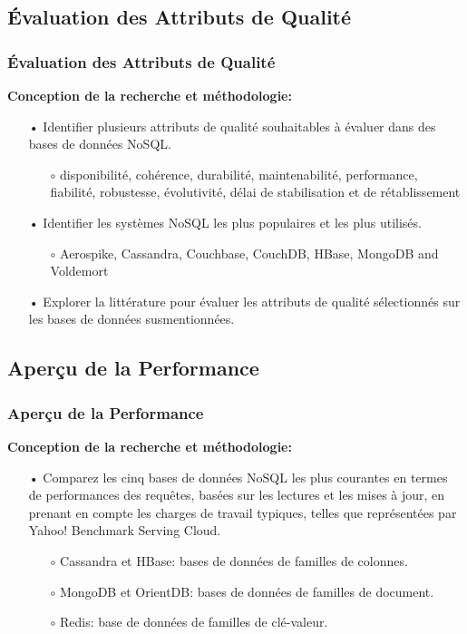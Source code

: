 \documentclass[xcolor=dvipsnames]{beamer}
\begin{document}
\subsection{Évaluation des Attributs de Qualité}
\begin{frame}[fragile]
	\frametitle{Évaluation des Attributs de Qualité}
	\textbf{Conception de la recherche et méthodologie:}
	\begin{itemize}
		\item[•] Identifier plusieurs attributs de qualité souhaitables à évaluer dans des bases de données NoSQL.
		\begin{itemize}
			\item[$\circ$] disponibilité, cohérence, durabilité, maintenabilité, performance, fiabilité, robustesse, évolutivité, délai de stabilisation et de rétablissement
		\end{itemize}
		\item[•] Identifier les systèmes NoSQL les plus populaires et les plus utilisés. 
		\begin{itemize}
			\item[$\circ$] Aerospike, Cassandra, Couchbase, CouchDB, HBase, MongoDB and Voldemort
		\end{itemize}
		\item[•] Explorer la littérature pour évaluer les attributs de qualité sélectionnés sur les bases de données susmentionnées.
	\end{itemize}	
\end{frame}

\subsection{Aperçu de la Performance}
\begin{frame}[fragile]
	\frametitle{Aperçu de la Performance}
	\textbf{Conception de la recherche et méthodologie:}
	\begin{itemize}
		\item[•] Comparez les cinq bases de données NoSQL les plus courantes en termes de performances des requêtes, basées sur les lectures et les mises à jour, en prenant en compte les charges de travail typiques, telles que représentées par Yahoo! Benchmark Serving Cloud.
		\begin{itemize}
			\item[$\circ$] Cassandra et HBase: bases de données de familles de colonnes.
			\item[$\circ$] MongoDB et OrientDB: bases de données de familles de document.
			\item[$\circ$] Redis: base de données de familles de clé-valeur.
		\end{itemize}
	\end{itemize}
\end{frame}
\end{document}
